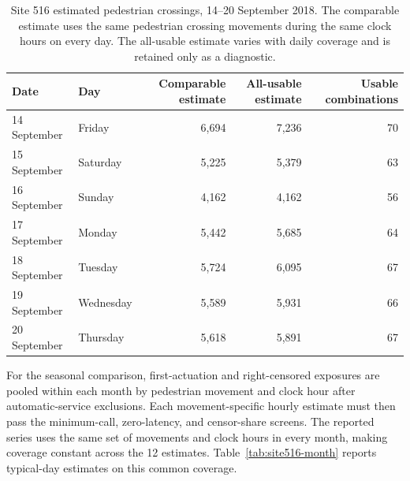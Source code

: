 \documentclass[11pt]{article}
\begin{document}
\begin{table}[htbp]
\centering
\caption{Site 516 estimated pedestrian crossings, 14--20 September 2018. The comparable estimate uses the same pedestrian crossing movements during the same clock hours on every day. The all-usable estimate varies with daily coverage and is retained only as a diagnostic.}
\label{tab:site516-week}
\footnotesize
\setlength{\tabcolsep}{5pt}
\begin{tabular}{@{}llrrr@{}}
\toprule
Date & Day & Comparable estimate & All-usable estimate & Usable combinations \\
\midrule
14 September & Friday    & 6{,}694 & 7{,}236 & 70 \\
15 September & Saturday  & 5{,}225 & 5{,}379 & 63 \\
16 September & Sunday    & 4{,}162 & 4{,}162 & 56 \\
17 September & Monday    & 5{,}442 & 5{,}685 & 64 \\
18 September & Tuesday   & 5{,}724 & 6{,}095 & 67 \\
19 September & Wednesday & 5{,}589 & 5{,}931 & 66 \\
20 September & Thursday  & 5{,}618 & 5{,}891 & 67 \\
\bottomrule
\end{tabular}
\end{table}

For the seasonal comparison, first-actuation and right-censored exposures are pooled within each month by pedestrian movement and clock hour after automatic-service exclusions. Each movement-specific hourly estimate must then pass the minimum-call, zero-latency, and censor-share screens. The reported series uses the same set of movements and clock hours in every month, making coverage constant across the 12 estimates. Table~\ref{tab:site516-month} reports typical-day estimates on this common coverage.%
\end{document}
